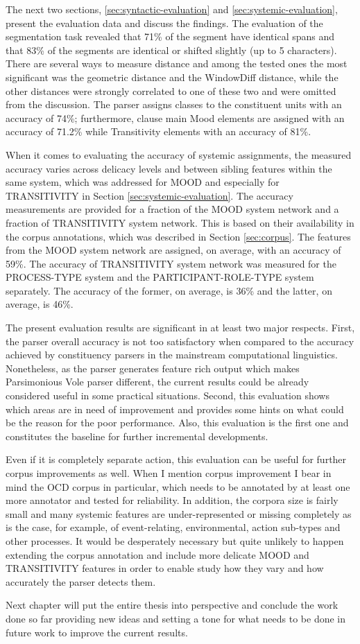     The next two sections, \ref{sec:syntactic-evaluation} and \ref{sec:systemic-evaluation}, present the evaluation data and discuss the findings. The evaluation of the segmentation task revealed that 71\% of the segment have identical spans and that 83\% of the segments are identical or shifted slightly (up to 5 characters). There are several ways to measure distance and among the tested ones the most significant was the geometric distance and the WindowDiff distance, while the other distances were strongly correlated to one of these two and were omitted from the discussion. 
    The parser assigns classes to the constituent units with an accuracy of 74\%; furthermore, clause main Mood elements are assigned with an accuracy of 71.2\% while Transitivity elements with an accuracy of 81\%. 
    
    When it comes to evaluating the accuracy of systemic assignments, the measured accuracy varies across delicacy levels and between sibling features within the same system, which was addressed for MOOD and especially for TRANSITIVITY in Section \ref{sec:systemic-evaluation}.
    The accuracy measurements are provided for a fraction of the MOOD system network and a fraction of TRANSITIVITY system network. This is based on their availability in the corpus annotations, which was described in Section \ref{sec:corpus}. The features from the MOOD system network are assigned, on average, with an accuracy of 59\%. The accuracy of TRANSITIVITY system network was measured for the PROCESS-TYPE system and the PARTICIPANT-ROLE-TYPE system separately. The accuracy of the former, on average, is 36\% and the latter, on average, is 46\%. 
    
    The present evaluation results are significant in at least two major respects. First, the parser overall accuracy is not too satisfactory when compared to the accuracy achieved by constituency parsers in the mainstream computational linguistics. Nonetheless, as the parser generates feature rich output which makes Parsimonious Vole parser different, the current results could be already considered useful in some practical situations. Second, this evaluation shows which areas are in need of improvement and provides some hints on what could be the reason for the poor performance. Also, this evaluation is the first one and constitutes the baseline for further incremental developments.
    
    Even if it is completely separate action, this evaluation can be useful for further corpus improvements as well. When I mention corpus improvement I bear in mind the OCD corpus in particular, which needs to be annotated by at least one more annotator and tested for reliability. In addition, the corpora size is fairly small and many systemic features are under-represented or missing completely as is the case, for example, of event-relating, environmental, action sub-types and other processes. It would be desperately necessary but quite unlikely to happen \citep[33]{mcenery2006corpus} extending the corpus annotation and include more delicate MOOD and TRANSITIVITY features in order to enable study how they vary and how accurately the parser detects them. 
    
    Next chapter will put the entire thesis into perspective and conclude the work done so far providing new ideas and setting a tone for what needs to be done in future work to improve the current results.